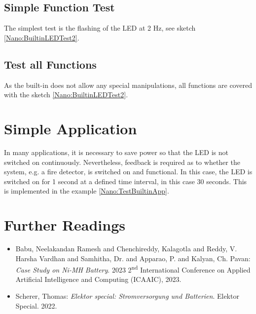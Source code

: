 \subsection{Simple Function Test}

The simplest test is the flashing of the LED at 2 Hz, see sketch \ref{Nano:BuiltinLEDTest2}.

{
  \label{Nano:BuiltinLEDTest2}
}


\subsection{Test all Functions}

As the built-in does not allow any special manipulations, all functions are covered with the sketch \ref{Nano:BuiltinLEDTest2}.

\section{Simple Application}

In many applications, it is necessary to save power so that the LED is not switched on continuously. Nevertheless, feedback is required as to whether the system, e.g. a fire detector, is switched on and functional. In this case, the LED is switched on for 1 second at a defined time interval, in this case 30 seconds. This is implemented in the example \ref{Nano:TestBuiltinApp}.

{
    \label{Nano:TestBuiltinApp}
}



\section{Further Readings}

\begin{itemize}
    \item Babu, Neelakandan Ramesh and  Chenchireddy, Kalagotla and  Reddy, V. Harsha Vardhan and  Samhitha, Dr. and Apparao, P. and  Kalyan, Ch. Pavan: \textsl{Case Study on Ni-MH Battery}. 2023 2\textsuperscript{nd} International Conference on Applied Artificial Intelligence and Computing (ICAAIC), 2023. \cite{Babu:2023}
    \item Scherer, Thomas: \textsl{Elektor special: Stromversorgung und Batterien}. Elektor Special. 2022. \cite{Scherer:2022}
\end{itemize}



